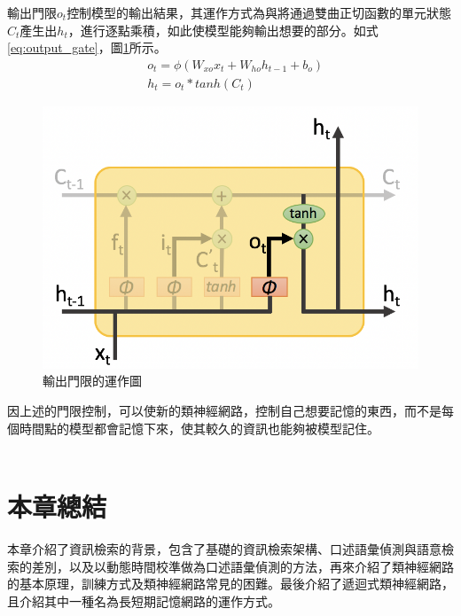 \begin{itemize}
輸出門限$o_t$控制模型的輸出結果，其運作方式為與將通過雙曲正切函數的單元狀態$C_t$產生出$h_t$，進行逐點乘積，如此使模型能夠輸出想要的部分。如式\ref{eq:output_gate}，圖\ref{fig:ch2_output_gate}所示。
\begin{equation}
\label{eq:output_gate}
	\begin{aligned}
		&o_t = \phi (W_{xo} x_t +W_{ho} h_{t-1} +b_o)
		\\
		&h_t = o_t * tanh(C_t)
	\end{aligned}
\end{equation}
\begin{figure}[ht]
\centering
\includegraphics[scale=0.5]{images/ch2_output_gate.png}
\caption{輸出門限的運作圖\cite{shen2016}} \label{fig:ch2_output_gate}
\end{figure}
\end{itemize}

因上述的門限控制，可以使新的類神經網路，控制自己想要記憶的東西，而不是每個時間點的模型都會記憶下來，使其較久的資訊也能夠被模型記住。
\\
\\

\section{本章總結}
本章介紹了資訊檢索的背景，包含了基礎的資訊檢索架構、口述語彙偵測與語意檢索的差別，以及以動態時間校準做為口述語彙偵測的方法，再來介紹了類神經網路的基本原理，訓練方式及類神經網路常見的困難。最後介紹了遞迴式類神經網路，且介紹其中一種名為長短期記憶網路的運作方式。
